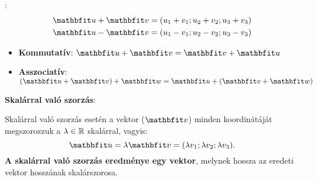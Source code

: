 \documentclass[a4paper, 12pt]{scrartcl}
\begin{document}
\begin{blueBox}
  \begin{minipage}{.5\textwidth}
    :
    \begin{align*}
      \rvec u + \rvec v & = (u_1 + v_1; u_2 + v_2; u_3 + v_3) \\
      \rvec u - \rvec v & = (u_1 - v_1; u_2 - v_2; u_3 - v_3)
    \end{align*}
    \begin{itemize}
      \item \textbf{Kommutatív}:
            $\rvec u + \rvec v = \rvec v + \rvec u$

      \item \textbf{Asszociatív}:
            $(\rvec u + \rvec v) + \rvec w = \rvec u + (\rvec v + \rvec w)$
    \end{itemize}
  \end{minipage}\begin{minipage}{.5\textwidth}
    \begin{center}
    \end{center}
  \end{minipage}
\end{blueBox}

\begin{blueBox}
  \textbf{Skalárral való szorzás}:

  Skalárral való szorzás esetén a vektor ($\rvec v$) minden koordinátáját
  megszorozzuk a $\lambda \in \mathbb{R}$ skalárral, vagyis:
  \[
    \rvec u = \lambda \rvec v = (\lambda v_1; \lambda v_2; \lambda v_3)
    \text.
  \]
  \textbf{A skalárral való szorzás eredménye egy vektor}, melynek hossza az
  eredeti vektor hosszának skalárszorosa.
\end{blueBox}
\end{document}
